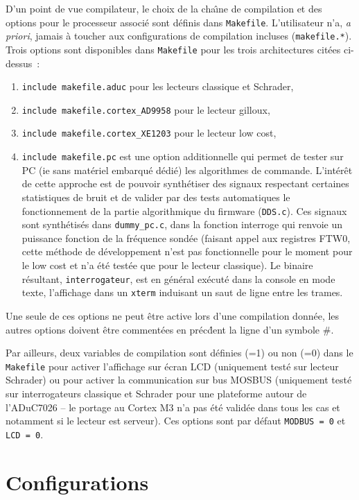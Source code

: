 \documentclass[a4paper]{article}
\begin{document}
D'un point de vue compilateur, le choix de la cha\^\i ne de compilation et des options pour le
processeur associ\'e sont d\'efinis dans {\tt Makefile}. L'utilisateur n'a, {\em a priori}, jamais
\`a toucher aux configurations de compilation incluses ({\tt makefile.*}). Trois options sont
disponibles dans {\tt Makefile} pour les trois architectures cit\'ees ci-dessus~:
\begin{enumerate}
\item {\tt include makefile.aduc} pour les lecteurs classique et Schrader,
\item {\tt include makefile.cortex\_AD9958} pour le lecteur gilloux,
\item {\tt include makefile.cortex\_XE1203} pour le lecteur low cost,
\item {\tt include makefile.pc} est une option additionnelle qui permet de tester sur PC (ie sans 
mat\'eriel embarqu\'e d\'edi\'e) les algorithmes de commande. L'int\'er\^et de cette approche
est de pouvoir synth\'etiser des signaux respectant certaines statistiques de bruit et de
valider par des tests automatiques le fonctionnement de la partie algorithmique du firmware ({\tt DDS.c}).
Ces signaux sont synth\'etis\'es dans {\tt dummy\_pc.c}, dans la fonction interroge qui renvoie un
puissance fonction de la fr\'equence sond\'ee (faisant appel aux registres FTW0, cette m\'ethode de
d\'eveloppement n'est pas fonctionnelle pour le moment pour le low cost et n'a \'et\'e test\'ee que
pour le lecteur classique). Le binaire r\'esultant, {\tt interrogateur}, est en g\'en\'eral ex\'ecut\'e
dans la console en mode texte, l'affichage dans un {\tt xterm} induisant un saut de ligne entre
les trames.
\end{enumerate}

Une seule de ces options ne peut \^etre active lors d'une compilation donn\'ee, les autres options
doivent \^etre comment\'ees en pr\'ec\'dent la ligne d'un symbole \#.

Par ailleurs, deux variables de compilation sont d\'efinies (=1) ou non (=0) dans le {\tt Makefile}
pour activer l'affichage sur \'ecran LCD (uniquement test\'e sur lecteur Schrader) ou pour
activer la communication sur bus MOSBUS (uniquement test\'e sur interrogateurs classique et Schrader
pour une plateforme autour de l'ADuC7026 -- le portage au Cortex M3 n'a pas \'et\'e valid\'ee dans tous
les cas et notamment si le lecteur est serveur). Ces options sont par d\'efaut {\tt MODBUS = 0} et
{\tt LCD    = 0}.

\section{Configurations}
\end{document}
